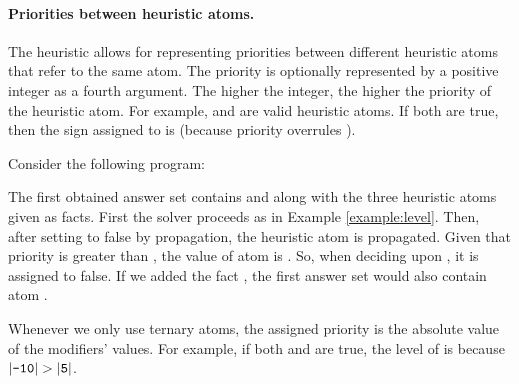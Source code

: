 \paragraph{Priorities between heuristic atoms.}

The  heuristic allows for representing priorities between different heuristic atoms that refer to the same atom.
The priority is optionally represented by a positive integer as a fourth argument.
The higher the integer, the higher the priority of the heuristic atom.
For example,  and  are valid heuristic atoms.
If both are true, then the sign assigned to  is  (because priority  overrules ).  

\begin{example}
\label{example:priority}
Consider the following program:

The first obtained answer set contains  and  along with the three heuristic atoms given as facts.
First the solver proceeds as in Example \ref{example:level}. 
Then, after setting  to false by propagation, 
the heuristic atom  is propagated.
Given that priority  is greater than ,
the  value of atom  is .
So, when deciding upon , it is assigned to false.
If we added the fact , 
the first answer set would also contain atom .
\end{example}

\begin{note}
Whenever we only use ternary  atoms, 
the assigned priority is the absolute value of the modifiers' values.
For example, 
if both  and  are true,
the level of  is  because $|\code{-10}|>|\code{5}|$.
\end{note}

